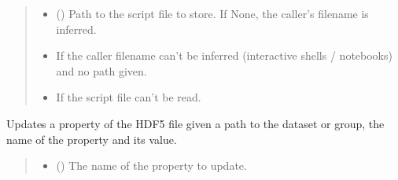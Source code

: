 \documentclass[letterpaper,10pt,english]{sphinxmanual}
\begin{document}
\begin{fulllineitems}
\begin{fulllineitems}
\begin{quote}
\begin{description}
\begin{itemize}
\item {} 
\sphinxAtStartPar
{} (\sphinxstyleliteralemphasis{\sphinxupquote{, }}) \textendash{} Path to the script file to store. If None, the caller’s filename is inferred.

\end{itemize}

\begin{itemize}
\item {} 
\sphinxAtStartPar
{} \textendash{} If the caller filename can’t be inferred (interactive shells / notebooks) and no path given.

\item {} 
\sphinxAtStartPar
{} \textendash{} If the script file can’t be read.

\end{itemize}

\end{description}\end{quote}

\end{fulllineitems}


\begin{fulllineitems}
\label{\detokenize{source/_autosummary/HDF5_BLS.Wrapper:HDF5_BLS.Wrapper.update_property}}
\pysigstartsignatures
\pysiglinewithargsret
{}
{\sphinxparamcomma {}\sphinxparamcomma {}\sphinxparamcomma {}}
{}
\pysigstopsignatures
\sphinxAtStartPar
Updates a property of the HDF5 file given a path to the dataset or group, the name of the property and its value.
\begin{quote}\begin{description}
\begin{itemize}
\item {} 
\sphinxAtStartPar
{} () \textendash{} The name of the property to update.


\end{itemize}
\end{description}
\end{quote}
\end{fulllineitems}
\end{fulllineitems}
\end{document}
